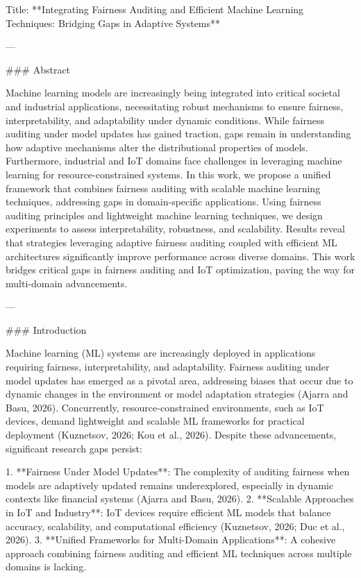 Title: **Integrating Fairness Auditing and Efficient Machine Learning Techniques: Bridging Gaps in Adaptive Systems**

---

### Abstract

Machine learning models are increasingly being integrated into critical societal and industrial applications, necessitating robust mechanisms to ensure fairness, interpretability, and adaptability under dynamic conditions. While fairness auditing under model updates has gained traction, gaps remain in understanding how adaptive mechanisms alter the distributional properties of models. Furthermore, industrial and IoT domains face challenges in leveraging machine learning for resource-constrained systems. In this work, we propose a unified framework that combines fairness auditing with scalable machine learning techniques, addressing gaps in domain-specific applications. Using fairness auditing principles and lightweight machine learning techniques, we design experiments to assess interpretability, robustness, and scalability. Results reveal that strategies leveraging adaptive fairness auditing coupled with efficient ML architectures significantly improve performance across diverse domains. This work bridges critical gaps in fairness auditing and IoT optimization, paving the way for multi-domain advancements.

---

### Introduction

Machine learning (ML) systems are increasingly deployed in applications requiring fairness, interpretability, and adaptability. Fairness auditing under model updates has emerged as a pivotal area, addressing biases that occur due to dynamic changes in the environment or model adaptation strategies (Ajarra and Basu, 2026). Concurrently, resource-constrained environments, such as IoT devices, demand lightweight and scalable ML frameworks for practical deployment (Kuznetsov, 2026; Kou et al., 2026). Despite these advancements, significant research gaps persist:

1. **Fairness Under Model Updates**: The complexity of auditing fairness when models are adaptively updated remains underexplored, especially in dynamic contexts like financial systems (Ajarra and Basu, 2026).
2. **Scalable Approaches in IoT and Industry**: IoT devices require efficient ML models that balance accuracy, scalability, and computational efficiency (Kuznetsov, 2026; Duc et al., 2026).
3. **Unified Frameworks for Multi-Domain Applications**: A cohesive approach combining fairness auditing and efficient ML techniques across multiple domains is lacking.

